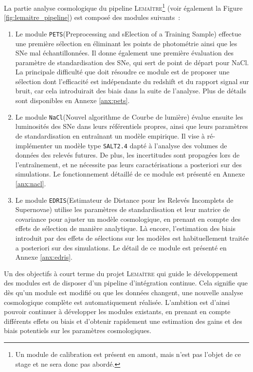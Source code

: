 \documentclass{book}
\def\lemaitre{\textsc{Lemaître}\xspace}
\def\pets{\texttt{PETS}\xspace}
\def\nacl{\texttt{NaCl}\xspace}
\def\edris{\texttt{EDRIS}\xspace}
\def\saltd{\texttt{SALT2.4}\xspace}
\begin{document}
La partie analyse cosmologique du pipeline \lemaitre \footnote{Un module de calibration est présent en amont, mais n'est pas l'objet de ce stage et ne sera donc pas abordé.} (voir également la Figure \ref{fig:lemaitre_pipeline}) est composé des modules suivants~:
\begin{enumerate}
    \item Le module \pets (Preprocessing and sElection of a Training Sample) effectue une première sélection en éliminant les points de photométrie ainsi que les SNe mal échantillonnées. Il donne également une première évaluation des paramètre de standardisation des SNe, qui sert de point de départ pour NaCl. La principale difficulté que doit résoudre ce module est de proposer une sélection dont l'efficacité est indépendante du redshift et du rapport signal sur bruit, car cela introduirait des biais dans la suite de l'analyse. Plus de détails sont disponibles en Annexe \ref{anx:pets}.
    \item Le module \nacl (Nouvel algorithme de Courbe de lumière) évalue ensuite les luminosités des SNe dans leurs référentiels propres, ainsi que leurs paramètres de standardisation en entraînant un modèle empirique. Il vise à ré-implémenter un modèle type \saltd dapté à l'analyse des volumes de données des relevés futures. De plus, les incertitudes sont propagées lors de l'entraînement, et ne nécessite pas leurs caractérisations a posteriori sur des simulations. Le fonctionnement détaillé de ce module est présenté en Annexe \ref{anx:nacl}.
    \item Le module \edris (Estimateur de Distance pour les Relevés Incomplets de Supernovae) utilise les paramètres de standardisation et leur matrice de covariance pour ajuster un modèle cosmologique, en prenant en compte des effets de sélection de manière analytique. Là encore, l'estimation des biais introduit par des effets de sélections sur les modèles est habituellement traitée a posteriori sur des simulations. Le détail de ce module est présenté en Annexe \ref{anx:edris}.
\end{enumerate}

Un des objectifs à court terme du projet \lemaitre qui guide le développement des modules est de disposer d'un pipeline d'intégration continue. Cela signifie que dès qu'un module est modifié ou que les données changent, une nouvelle analyse cosmologique complète est automatiquement réalisée. L'ambition est d'ainsi pouvoir continuer à développer les modules existants, en prenant en compte différents effets ou biais et d'obtenir rapidement une estimation des gains et des biais potentiels sur les paramètres cosmologiques.
\end{document}
